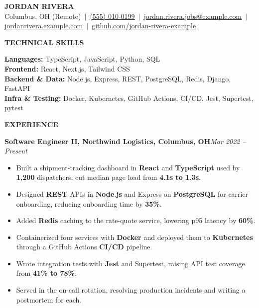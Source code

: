 \documentclass[letterpaper,10.5pt]{article}
\newcommand{\resSection}[1]{%
  \vspace{5pt}%
  {\color{accent}\large\bfseries\MakeUppercase{#1}}%
  \hspace{6pt}{\color{accent}\leaders\hrule height 0.7pt\hfill\kern0pt}\par
  \vspace{3pt}}
\newcommand{\resRole}[4]{%
  \vspace{3pt}%
  {\small\textbf{\color{accent}#1}\textbf{, #2, #3}\hfill\textit{#4}}\par
  \vspace{1pt}}
\newenvironment{resBullets}
  {\begin{itemize}[leftmargin=0.32in, itemsep=1pt, parsep=0pt, topsep=1pt, label={\tiny\raisebox{1.5pt}{$\bullet$}}]\small}
  {\end{itemize}}
\begin{document}
\begin{center}
  {\color{accent}\Huge\bfseries JORDAN RIVERA}\\[4pt]
  \footnotesize Columbus, OH (Remote) \,$|$\, \href{tel:5550100199}{\underline{(555) 010-0199}} \,$|$\, \href{mailto:jordan.rivera.jobs@example.com}{\underline{jordan.rivera.jobs@example.com}} \,$|$\, \href{https://jordanrivera.example.com}{\underline{jordanrivera.example.com}} \,$|$\, \href{https://github.com/jordan-rivera-example}{\underline{github.com/jordan-rivera-example}}
\end{center}
\vspace{-4pt}

\resSection{Technical Skills}
{\small
\textbf{Languages:} TypeScript, JavaScript, Python, SQL \\
\textbf{Frontend:} React, Next.js, Tailwind CSS \\
\textbf{Backend \& Data:} Node.js, Express, REST, PostgreSQL, Redis, Django, FastAPI \\
\textbf{Infra \& Testing:} Docker, Kubernetes, GitHub Actions, CI/CD, Jest, Supertest, pytest
\par}

\resSection{Experience}
\resRole{Software Engineer II}{Northwind Logistics}{Columbus, OH}{Mar 2022 -- Present} %
\begin{resBullets}
  \item Built a shipment-tracking dashboard in \textbf{React} and \textbf{TypeScript} used by \textbf{1,200} dispatchers; cut median page load from \textbf{4.1s to 1.3s}. %
  \item Designed \textbf{REST} APIs in \textbf{Node.js} and Express on \textbf{PostgreSQL} for carrier onboarding, reducing onboarding time by \textbf{35\%}. %
  \item Added \textbf{Redis} caching to the rate-quote service, lowering p95 latency by \textbf{60\%}. %
  \item Containerized four services with \textbf{Docker} and deployed them to \textbf{Kubernetes} through a GitHub Actions \textbf{CI/CD} pipeline. %
  \item Wrote integration tests with \textbf{Jest} and Supertest, raising API test coverage from \textbf{41\% to 78\%}. %
  \item Served in the on-call rotation, resolving production incidents and writing a postmortem for each. %
\end{resBullets}
\end{document}

